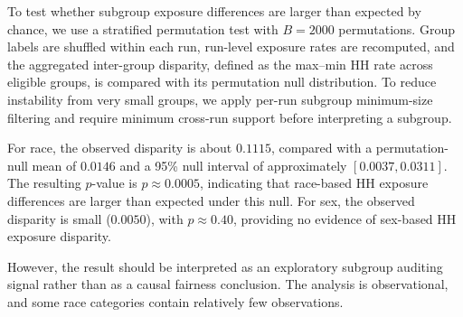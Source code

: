 To test whether subgroup exposure differences are larger than expected by chance, we use
a stratified permutation test with \(B=2000\) permutations. Group labels are shuffled
within each run, run-level exposure rates are recomputed, and the aggregated inter-group
disparity, defined as the max--min HH rate across eligible groups, is compared with its
permutation null distribution. To reduce instability from very small groups, we apply
per-run subgroup minimum-size filtering and require minimum cross-run support before
interpreting a subgroup.

For race, the observed disparity is about \(0.1115\), compared with a permutation-null
mean of \(0.0146\) and a 95\% null interval of approximately \([0.0037, 0.0311]\). The
resulting \(p\)-value is \(p \approx 0.0005\), indicating that race-based HH exposure
differences are larger than expected under this null. For sex, the observed disparity is
small (\(0.0050\)), with \(p \approx 0.40\), providing no evidence of sex-based HH exposure
disparity.

However, the result should be interpreted as an exploratory subgroup auditing signal
rather than as a causal fairness conclusion. The analysis is observational, and some race
categories contain relatively few observations.